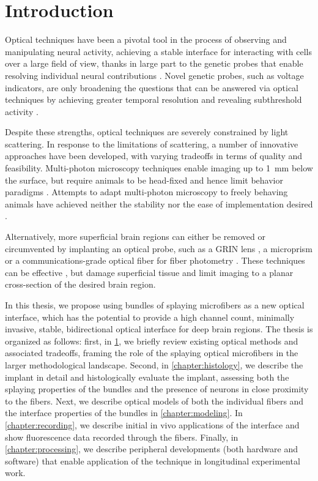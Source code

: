 \chapter{Introduction}
\label{chapter:intro}

\thispagestyle{myheadings}

Optical techniques have been a pivotal tool in the 
process of observing and manipulating neural activity, 
achieving a stable interface for interacting with cells 
over a large field of view, thanks in large part to the 
genetic probes that enable resolving individual 
neural contributions \cite{Emiliani:2015jl}. 
Novel genetic probes, such as voltage 
indicators, are only broadening the questions that can 
be answered via optical techniques by achieving 
greater temporal resolution and revealing subthreshold 
activity \cite{Gong:2015is}.

Despite these strengths, optical techniques are severely 
constrained by light scattering. In response to the 
limitations of scattering, a number of innovative approaches 
have been developed, with varying tradeoffs in terms of quality 
and feasibility. Multi-photon microscopy techniques enable 
imaging up to 1~mm below the surface, but require animals to 
be head-fixed and hence limit behavior paradigms 
\cite{Horton:2013gxa}. Attempts to adapt multi-photon microscopy 
to freely behaving animals have achieved neither the 
stability nor the ease of implementation desired 
\cite{Helmchen:2001tw,Flusberg:2005tq}.

Alternatively, more superficial brain regions can either 
be removed \cite{Dombeck:2010jr} or circumvented 
by implanting an optical probe, such as a GRIN lens 
\cite{Barretto:2009hk}, a microprism \cite{Andermann:2013kc}
or a communications-grade optical fiber for fiber 
photometry \cite{Guo:2015gu}. These techniques can be 
effective \cite{Betley:2015cn}, but damage superficial 
tissue and limit imaging to a planar cross-section 
of the desired brain region. 

In this thesis, we propose using bundles of splaying 
microfibers as a new optical interface, which has the 
potential to provide a high channel count, minimally 
invasive, stable, bidirectional optical interface for 
deep brain regions. The thesis is organized as follows: 
first, in \cref{chapter:intro}, we briefly review 
existing optical methods and associated tradeoffs, 
framing the role of the splaying optical microfibers in
the larger methodological landscape. Second, in 
\cref{chapter:histology}, we describe the implant in 
detail and histologically evaluate the implant, 
assessing both the splaying properties of the bundles
and the presence of neurons in close proximity to
the fibers. Next, we describe optical models of both 
the individual fibers and the interface properties of 
the bundles in \cref{chapter:modeling}. In 
\cref{chapter:recording}, we describe initial in vivo
applications of the interface and show fluorescence 
data recorded through the fibers. Finally, in
\cref{chapter:processing}, we describe peripheral 
developments (both hardware and software) that enable 
application of the technique in longitudinal 
experimental work.

